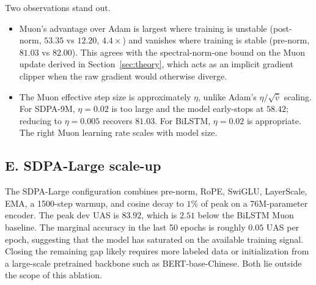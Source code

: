 Two observations stand out.
\begin{itemize}[leftmargin=*, itemsep=2pt]
  \item Muon's advantage over Adam is largest where training is unstable (post-norm, $53.35$ vs $12.20$, $4.4\times$) and vanishes where training is stable (pre-norm, $81.03$ vs $82.00$). This agrees with the spectral-norm-one bound on the Muon update derived in Section~\ref{sec:theory}, which acts as an implicit gradient clipper when the raw gradient would otherwise diverge.
  \item The Muon effective step size is approximately $\eta$, unlike Adam's $\eta/\sqrt{\hat{v}}$ scaling. For SDPA-9M, $\eta{=}0.02$ is too large and the model early-stops at $58.42$; reducing to $\eta{=}0.005$ recovers $81.03$. For BiLSTM, $\eta{=}0.02$ is appropriate. The right Muon learning rate scales with model size.
\end{itemize}

\subsection{E. SDPA-Large scale-up}
\label{sec:exp-large}

The SDPA-Large configuration combines pre-norm, RoPE, SwiGLU, LayerScale, EMA, a 1500-step warmup, and cosine decay to $1\%$ of peak on a 76M-parameter encoder. The peak dev UAS is $83.92$, which is $2.51$ below the BiLSTM Muon baseline. The marginal accuracy in the last 50 epochs is roughly $0.05$ UAS per epoch, suggesting that the model has saturated on the available training signal. Closing the remaining gap likely requires more labeled data or initialization from a large-scale pretrained backbone such as BERT-base-Chinese. Both lie outside the scope of this ablation.
